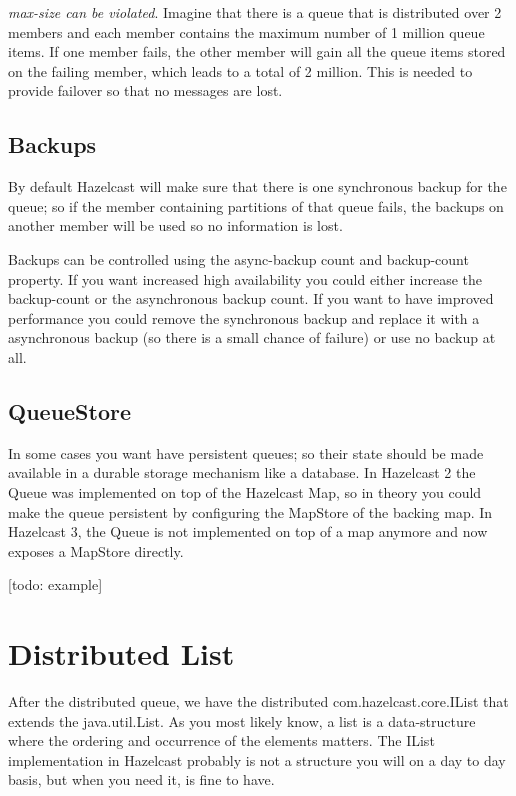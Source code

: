 \emph{max-size can be violated}. Imagine that there is a queue that is distributed over 2 members and each member contains the maximum number of 1 million queue items. If one member fails, the other member will gain all the queue items stored on the failing member, which leads to a total of 2 million. This is needed to provide failover so that no messages are lost. 

\subsection{Backups}
By default Hazelcast will make sure that there is one synchronous backup for the queue; so if the member containing partitions of that queue fails, the backups on another member will be used so no information is lost.

Backups can be controlled using the async-backup count and backup-count property. If you want increased high availability you could either increase the backup-count or the asynchronous backup count. If you want to have improved performance you could remove the synchronous backup and replace it with a asynchronous backup (so there is a small chance of failure) or use no backup at all.

\subsection{QueueStore}
In some cases you want have persistent queues; so their state should be made available in a durable storage mechanism like a database. In Hazelcast 2 the Queue was implemented on top of the Hazelcast Map, so in theory you could make the queue persistent by configuring the MapStore of the backing map. In Hazelcast 3, the Queue is not implemented on top of a map anymore and now exposes a MapStore directly.


[todo: example]

\section{Distributed List}
After the distributed queue, we have the distributed com.hazelcast.core.IList that extends the java.util.List. As you most likely know, a list is a data-structure where the ordering and occurrence of the elements matters. The IList implementation in Hazelcast probably is not a structure you will on a day to day basis, but when you need it, is fine to have.

